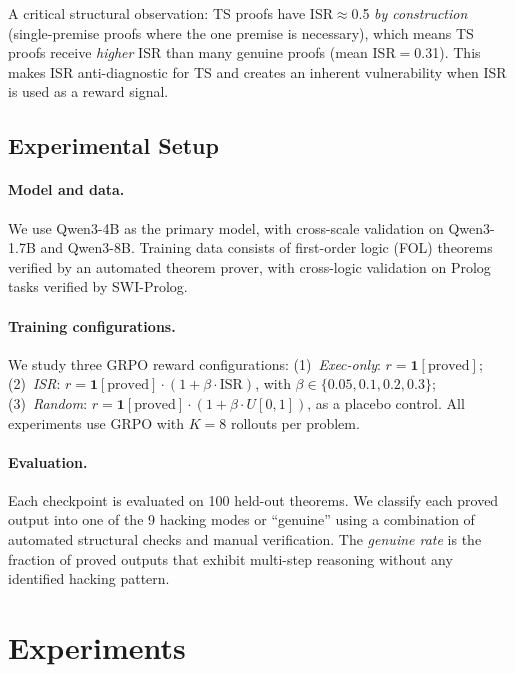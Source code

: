 \documentclass[11pt,a4paper]{article}
\begin{document}
A critical structural observation: TS proofs have ISR$\approx$0.5 \emph{by construction} (single-premise proofs where the one premise is necessary), which means TS proofs receive \emph{higher} ISR than many genuine proofs (mean ISR$=$0.31). This makes ISR anti-diagnostic for TS and creates an inherent vulnerability when ISR is used as a reward signal.

\subsection{Experimental Setup}

\paragraph{Model and data.}
We use Qwen3-4B as the primary model, with cross-scale validation on Qwen3-1.7B and Qwen3-8B.
Training data consists of first-order logic (FOL) theorems verified by an automated theorem prover, with cross-logic validation on Prolog tasks verified by SWI-Prolog.

\paragraph{Training configurations.}
We study three GRPO reward configurations:
(1)~\emph{Exec-only}: $r = \mathbf{1}[\text{proved}]$;
(2)~\emph{ISR}: $r = \mathbf{1}[\text{proved}] \cdot (1 + \beta \cdot \text{ISR})$, with $\beta \in \{0.05, 0.1, 0.2, 0.3\}$;
(3)~\emph{Random}: $r = \mathbf{1}[\text{proved}] \cdot (1 + \beta \cdot U[0,1])$, as a placebo control.
All experiments use GRPO with $K{=}8$ rollouts per problem.

\paragraph{Evaluation.}
Each checkpoint is evaluated on 100 held-out theorems.
We classify each proved output into one of the 9 hacking modes or ``genuine'' using a combination of automated structural checks and manual verification.
The \emph{genuine rate} is the fraction of proved outputs that exhibit multi-step reasoning without any identified hacking pattern.

\section{Experiments}
\end{document}
